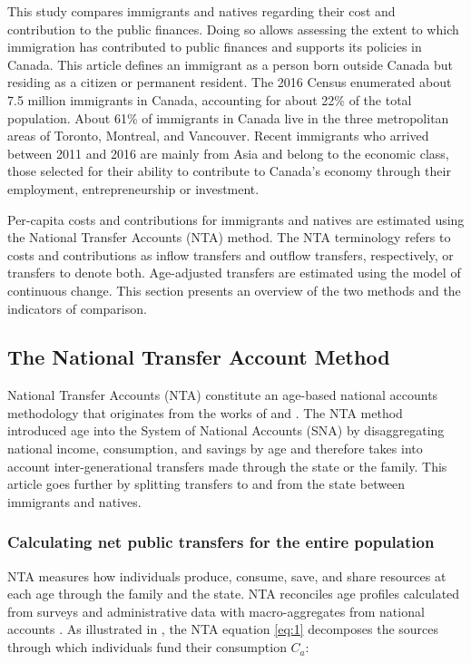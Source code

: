 This study compares immigrants and natives regarding their cost and contribution to the public finances.
Doing so allows assessing the extent to which immigration has contributed to public finances and supports its policies in Canada.
This article defines an immigrant as a person born outside Canada but residing as a citizen or permanent resident.
The 2016 Census enumerated about 7.5 million immigrants in Canada, accounting for about 22\% of the total population.
About 61\% of immigrants in Canada live in the three metropolitan areas of Toronto, Montreal, and Vancouver.
Recent immigrants who arrived between 2011 and 2016 are mainly from Asia and belong to the economic class, those selected for their ability to contribute to Canada's economy through their employment, entrepreneurship or investment.

\vspace{0.7em}\par
Per-capita costs and contributions for immigrants and natives are estimated using the National Transfer Accounts (NTA) method.
The NTA terminology refers to costs and contributions as inflow transfers and outflow transfers, respectively, or transfers to denote both.
Age-adjusted transfers are estimated using the model of continuous change.
This section presents an overview of the two methods and the indicators of comparison.

\subsection{The National Transfer Account Method}\label{sec:nta}
National Transfer Accounts (NTA) constitute an age-based national accounts methodology that originates from the works of \citet{Lee:1980ci} and \citet{Mason:1988fz}.
The NTA method introduced age into the System of National Accounts (SNA) by disaggregating national income, consumption, and savings by age and therefore takes into account inter-generational transfers made through the state or the family.
This article goes further by splitting transfers to and from the state between immigrants and natives.

\subsubsection*{Calculating net public transfers for the entire population}
NTA measures how individuals produce, consume, save, and share resources at each age through the family and the state.
NTA reconciles age profiles calculated from surveys and administrative data with macro-aggregates from national accounts \citep{UnitedNations:2013vz}.
As illustrated in \citet{dAlbis:2019de}, the NTA equation \eqref{eq:1} decomposes the sources through which individuals fund their consumption \(C_a\):

